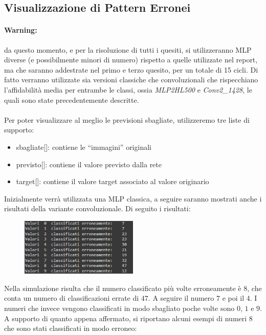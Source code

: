 \documentclass[12pt, a4paper]{article}
\begin{document}
\subsection{Visualizzazione di Pattern Erronei}
\paragraph{Warning:} da questo momento, e per la risoluzione di tutti i quesiti, si utilizzeranno MLP diverse (e possibilmente minori di numero) rispetto a quelle utilizzate nel report, ma che saranno addestrate nel primo e terzo quesito, per un totale di 15 cicli. Di fatto verranno utilizzate sia versioni classiche che convoluzionali che rispecchiano l'affidabilità media per entrambe le classi, ossia \textit{MLP2HL500} e \textit{Conv2\_1428}, le quali sono state precedentemente descritte. \\\\ 
Per poter visualizzare al meglio le previsioni sbagliate, utilizzeremo tre liste di supporto:
\begin{itemize}
    \item sbagliate[]: contiene le “immagini” originali
    \item previsto[]: contiene il valore previsto dalla rete
    \item target[]: contiene il valore target associato al valore originario
\end{itemize}

Inizialmente verrà utilizzata una MLP classica, a seguire saranno mostrati anche i risultati della variante convoluzionale.
Di seguito i risultati:
\begin{figure}[H]
    \centering
    \includegraphics[width=0.50\textwidth]{ErrateClassica.png}
\end{figure}

Nella simulazione risulta che il numero classificato più volte erroneamente è \(8\), che conta un numero di classificazioni errate di \(47\). A seguire il numero \(7\) e poi il \(4\). I numeri che invece vengono classificati in modo sbagliato poche volte sono \(0\), \(1\) e \(9\).\\
A supporto di quanto appena affermato, si riportano alcuni esempi di numeri \(8\) che sono stati classificati in modo erroneo:
\end{document}
